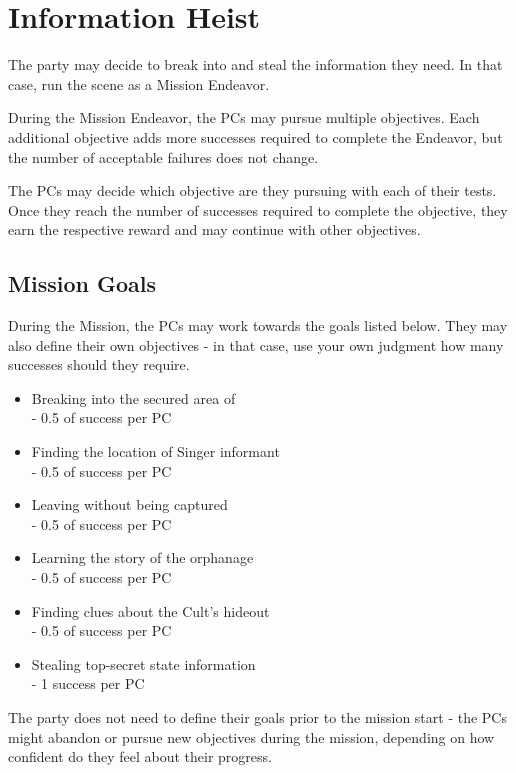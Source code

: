 \section{Information Heist}
\label{sec:informationHeist}

The party may decide to break into \locationIndicium{} and steal the information they need. In that case, run the scene as a Mission Endeavor.

During the Mission Endeavor, the PCs may pursue multiple objectives. Each additional objective adds more successes required to complete the Endeavor, but the number of acceptable failures does not change. 

The PCs may decide which objective are they pursuing with each of their tests. Once they reach the number of successes required to complete the objective, they earn the respective reward and may continue with other objectives.




\subsection{Mission Goals}

During the Mission, the PCs may work towards the goals listed below. They may also define their own objectives - in that case, use your own judgment how many successes should they require.

\begin{itemize}
	\item Breaking into the secured area of \locationIndicium{} \\- 0.5 of success per PC
	\item Finding the location of Singer informant \\- 0.5 of success per PC
	\item Leaving \locationIndicium{} without being captured \\- 0.5 of success per PC
	\item Learning the story of the orphanage \\- 0.5 of success per PC
	\item Finding clues about the Cult's hideout \\- 0.5 of success per PC
	\item Stealing top-secret state information \\- 1 success per PC
\end{itemize} 

The party does not need to define their goals prior to the mission start - the PCs might abandon or pursue new objectives during the mission, depending on how confident do they feel about their progress.

